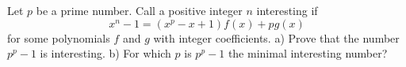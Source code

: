 Let $p$ be a prime number. Call a positive integer $n$ interesting if
\[x^n-1=(x^p-x+1)f(x)+pg(x)\]
for some polynomials $f$ and $g$ with integer coefficients.
a) Prove that the number $p^p-1$ is interesting.
b) For which $p$ is $p^p-1$ the minimal interesting number?